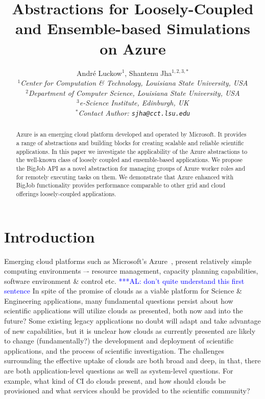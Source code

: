 \documentclass[conference,final]{IEEEtran}
\title{Abstractions for Loosely-Coupled and Ensemble-based Simulations
  on Azure\up}
\author{
Andr\'e Luckow$^{1}$, Shantenu Jha$^{1,2,3,*}$\\
  \small{\emph{$^{1}$Center for Computation \& Technology, Louisiana State University, USA}}\\
  \small{\emph{$^{2}$Department of Computer Science, Louisiana State University, USA}}\\
  \small{\emph{$^{3}$e-Science Institute, Edinburgh, UK}}\\
  \small{\emph{$^{*}$Contact Author: \texttt{sjha@cct.lsu.edu}}}\\
  \up\up\up\up
}
\newcommand{\up}{\vspace*{-1em}}
\newcommand{\alnote}[1]{ {\textcolor{blue} { ***AL: #1 }}}
\newcommand{\alnote}[1]{}
\begin{document}
 

\maketitle    

\begin{abstract}
  Azure is an emerging cloud platform developed and operated by
  Microsoft.  It provides a range of abstractions and building blocks
  for creating scalable and reliable scientific applications.  In this
  paper we investigate the applicability of the Azure abstractions to
  the well-known class of loosely coupled and ensemble-based
  applications.  We propose the BigJob API as a novel abstraction for
  managing groups of Azure worker roles and for remotely executing
  tasks on them. We demonstrate that Azure enhanced with BigJob
  functionality provides performance comparable to other grid and
  cloud offerings loosely-coupled applications.  \up \up

\end{abstract}

\section{Introduction}
\up
Emerging cloud platforms such as Microsoft's Azure~\cite{winazure},
present relatively simple computing environments –-
resource management, capacity planning capabilities, software
environment \& control etc.\alnote{don't quite understand this first sentence} 
In spite of the promise of clouds as a
viable platform for Science \& Engineering applications, many
fundamental questions persist about how scientific applications will
utilize clouds as presented, both now and into the future? Some
existing legacy applications no doubt will adapt and take advantage of
new capabilities, but it is unclear how clouds as currently presented
are likely to change (fundamentally?)  the development and deployment
of scientific applications, and the process of scientific
investigation. The challenges surrounding the effective uptake of
clouds are both broad and deep, in that, there are both
application-level questions as well as system-level questions. For
example, what kind of CI do clouds present, and how should clouds be
provisioned and what services should be provided to the scientific
community?
\end{document}
